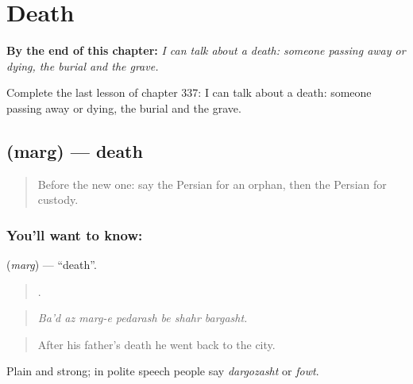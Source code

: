 
\chapter{Death}
\label{ch:fa-death}

\begin{chapteropening}
\textbf{By the end of this chapter:} \emph{I can talk about a death: someone passing away or dying, the burial and the grave.}

Complete the last lesson of chapter 337: I can talk about a death: someone passing away or dying, the burial and the grave.
\end{chapteropening}

\section[\texorpdfstring{\fa{مرگ} (marg)}{مرگ (marg)}]{ (marg) — death}

\label{lesson:FA-C337-marg}



\begin{quote}
Before the new one: say the Persian for an orphan, then the Persian for custody.
\end{quote}

\subsection*{You'll want to know: }
\textbf{} (\emph{marg}) — \textquotedblleft{}death\textquotedblright{}.

\begin{quote}
      .
\end{quote}

\begin{quote}
\emph{Ba'd az marg-e pedarash be shahr bargasht.}
\end{quote}

\begin{quote}
After his father's death he went back to the city.
\end{quote}

Plain and strong; in polite speech people say \emph{dargozasht} or \emph{fowt}.

